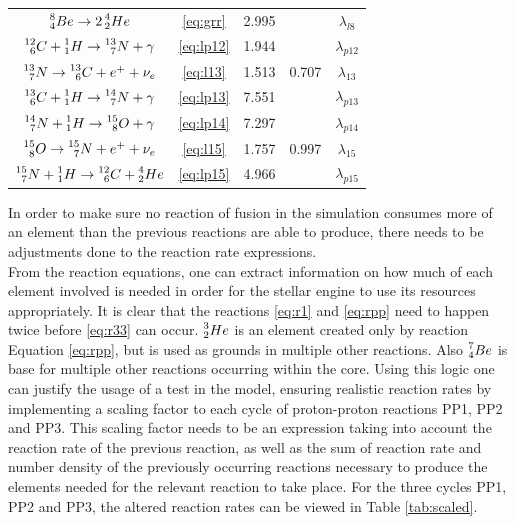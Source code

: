 \documentclass[10pt, nofootinbib, twocolumn]{revtex4-1}
\begin{document}
\begin{table}[H]
\begin{tabular*}{0.5\textwidth}{@{\extracolsep{\fill}}ccccc}
     $\prescript{8}{4}Be \rightarrow 2\prescript{4}{2}He$& \eqref{eq:grr} &2.995& &$\lambda_{l8}$\\
     $\prescript{12}{6}C+\prescript{1}{1}H\rightarrow\prescript{13}{7}N+\gamma$& \eqref{eq:lp12} &1.944& &$\lambda_{p12}$\\
     $\prescript{13}{7}N \rightarrow \prescript{13}{6}C+e^++\nu_e$& \eqref{eq:l13} &1.513&0.707 &$\lambda_{13}$\\
     $\prescript{13}{6}C + \prescript{1}{1}H\rightarrow \prescript{14}{7}N+\gamma$& \eqref{eq:lp13} &7.551& &$\lambda_{p13}$\\
     $\prescript{14}{7}N + \prescript{1}{1}H\rightarrow \prescript{15}{8}O+\gamma$& \eqref{eq:lp14} &7.297& &$\lambda_{p14}$\\
     $\prescript{15}{8}O \rightarrow \prescript{15}{7}N +e^++\nu_e$& \eqref{eq:l15} &1.757& 0.997&$\lambda_{15}$\\
     $\prescript{15}{7}N + \prescript{1}{1}H\rightarrow \prescript{12}{6}C + \prescript{4}{2}He$& \eqref{eq:lp15} &4.966& &$\lambda_{p15}$  
    \label{tab:en}
    \end{tabular*}
\end{table}

In order to make sure no reaction of fusion in the simulation consumes more of an element than the previous reactions are able to produce, there needs to be adjustments done to the reaction rate expressions. \\

From the reaction equations, one can extract information on how much of each element involved is needed in order for the stellar engine to use its resources appropriately. It is clear that the reactions \eqref{eq:r1} and \eqref{eq:rpp} need to happen twice before \eqref{eq:r33} can occur. $\prescript{3}{2}He$ is an element created only by reaction Equation \eqref{eq:rpp}, but is used as grounds in multiple other reactions. Also $\prescript{7}{4}Be$ is base for multiple other reactions occurring within the core. Using this logic one can justify the usage of a test in the model, ensuring realistic reaction rates by implementing a scaling factor to each cycle of proton-proton reactions PP1, PP2 and PP3. This scaling factor needs to be an expression taking into account the reaction rate of the previous reaction, as well as the sum of reaction rate and number density of the previously occurring reactions necessary to produce the elements needed for the relevant reaction to take place. For the three cycles PP1, PP2 and PP3, the altered reaction rates can be viewed in Table \ref{tab:scaled}. 
\end{document}
